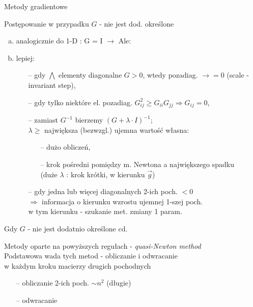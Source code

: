   \begin{frame}{Metody gradientowe}

 	\begin{block}{Postępowanie w przypadku $G$ - nie jest dod. określone}
 	   \begin{enumerate}[a)]
 	   		\item analogicznie do 1-D : G = I $\rightarrow$ Ale:
 	   		\item lepiej:
 	   		\begin{itemize}
 	   			\item[--] gdy $\bigwedge$ elementy diagonalne $G > 0$, wtedy pozadiag. $\rightarrow = 0$ (scale - invariant step),
 	   			\item[--] gdy tylko niektóre el. pozadiag. $G_{ij}^2 \geq G_{ii}G_{jj} \Rightarrow G_{ij} = 0$,
 	   			\item[--] zamiast $G^{-1}$ bierzemy $(G + \lambda \cdot I)^{-1}$;
 	   			\\ $\lambda \geq$ największa (bezwzgl.) ujemna wartość własna:
 	   			\begin{itemize}
 	   				\item[--] dużo obliczeń,
 	   				\item[--] krok pośredni pomiędzy m. Newtona a największego spadku
 	   				\\(duże $\lambda$ : krok krótki, w kierunku $\vec{g}$)
 	   			\end{itemize}
 	   			\item[--] gdy jedna lub więcej diagonalnych 2-ich poch. $< 0$
 	   			\\ $\Rightarrow$ informacja o kierunku wzrostu ujemnej 1-szej poch.
 	   			\\w tym kierunku - szukanie met. zmiany 1 param.
 	   		\end{itemize}
 	   \end{enumerate}
 	\end{block}

  \end{frame}

  \begin{frame}{Gdy $G$ - nie jest dodatnio określone cd.}

 	\begin{block}{}
 	Metody oparte na powyższych regułach - \emph{quasi-Newton method}
 	\medskip
 	\\Podstawowa wada tych metod - obliczanie i odwracanie
 	\\w każdym kroku macierzy drugich pochodnych
 	\smallskip
 	   	\begin{itemize}
 	   		\item[--] obliczanie 2-ich poch. $\sim n^2$ (długie)
 	   		\item[--] odwracanie
 	   	\end{itemize}
 	\end{block}

  \end{frame}

